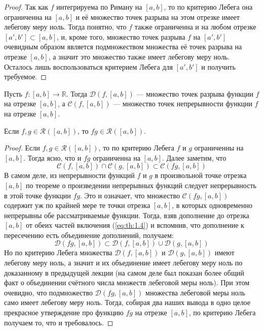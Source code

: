 \documentclass[11pt]{article}
\begin{document}
\begin{proof}
    Так как $f$ интегрируема по Риману на $[a, b]$, то по критерию Лебега она ограниченна на $[a, b]$ и её множество точек разрыва на этом отрезке имеет лебегову меру ноль. Тогда понятно, что $f$ также ограниченна и на любом отрезке $[a', b'] \subset [a, b]$, и, кроме того, множество точек разрыва $f$ на $[a', b']$ очевидным образом является подмножеством множества её точек разрыва на отрезке $[a, b]$, а значит это множество также имеет лебегову меру ноль. Осталось лишь воспользоваться критерием Лебега для $[a', b']$ и получить требуемое.
\end{proof}

\begin{definition}
    Пусть $f \colon [a, b] \to \mathbb{R}$. Тогда $\mathcal{D}(f, [a, b])$ --- множество точек разрыва функции $f$ на отрезке $[a, b]$, а $\mathcal{C}(f, [a, b])$ --- множество точек непрерывности функции $f$ на отрезке $[a, b]$.
\end{definition}

\begin{theorem}
    Если $f, g \in \mathcal{R}([a, b])$, то $f g \in \mathcal{R}([a, b])$.
\end{theorem}

\begin{proof}
    Если $f, g \in \mathcal{R}([a, b])$, то по критерию Лебега $f$ и $g$ ограниченны на $[a, b]$. Тогда ясно, что и $f g$ ограниченна на $[a, b]$. Далее заметим, что 
    \begin{equation*} \label{eq:th:1.4} \tag{$\ast$}
        \mathcal{C}(f, [a, b]) \cap \mathcal{C}(g, [a, b]) \subset \mathcal{C}(fg, [a, b])
    \end{equation*}
    В самом деле, из непрерывности функций $f$ и $g$ в произвольной точке отрезка $[a, b]$ по теореме о произведении непрерывных функций следует непрерывность в этой точке функции $fg$. Это и означает, что множество $\mathcal{C}(fg, [a, b])$ содержит уж по крайней мере те точки отрезка $[a, b]$, в которых одновременно непрерывны обе рассматриваемые функции. Тогда, взяв дополнение до отрезка $[a, b]$ от обеих частей включения (\ref{eq:th:1.4}) и вспомнив, что дополнение к пересечению есть объединение дополнений, получаем:
    \[\mathcal{D}(fg, [a, b]) \subset \mathcal{D}(f, [a, b]) \cup \mathcal{D}(g, [a, b])\]
    Но по критерию Лебега множества $\mathcal{D}(f, [a, b])$ и $\mathcal{D}(g, [a, b])$ имеют лебегову меру ноль, а значит и их объединение имеет лебегову меру ноль по доказанному в предыдущей лекции (на самом деле был показан более общий факт о объединении счётного числа множеств лебеговой меры ноль). При этом очевидно, что подмножество $\mathcal{D}(fg, [a, b])$ множества лебеговой меры ноль само имеет лебегову меру ноль. Тогда, собирая два наших вывода в одно целое прекрасное утверждение про функцию $fg$ на отрезке $[a, b]$, по критерию Лебега получаем то, что и требовалось.
\end{proof}
\end{document}
